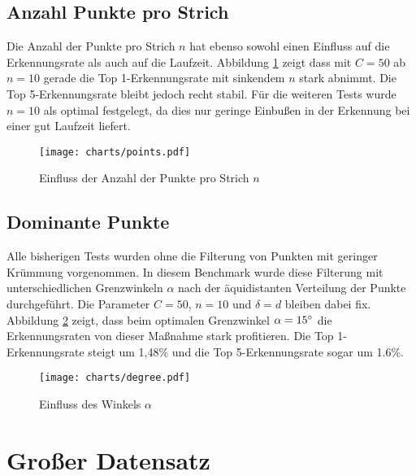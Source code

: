 \subsection{Anzahl Punkte pro Strich} %
\label{sub:anzahl_punkte_pro_strich}

Die Anzahl der Punkte pro Strich $n$ hat ebenso sowohl einen Einfluss auf die Erkennungsrate als auch auf die Laufzeit. Abbildung \ref{chart:points} zeigt dass mit $C=50$ ab $n=10$ gerade die Top 1-Erkennungsrate mit sinkendem $n$ stark abnimmt. Die Top 5-Erkennungsrate bleibt jedoch recht stabil. Für die weiteren Tests wurde $n=10$ als optimal festgelegt, da dies nur geringe Einbußen in der Erkennung bei einer gut Laufzeit liefert.

\begin{figure}[htbp]
  \begin{center}
    \texttt{[image: charts/points.pdf]}
  \end{center}
  \caption{Einfluss der Anzahl der Punkte pro Strich $n$}
  \label{chart:points}
\end{figure}


\subsection{Dominante Punkte} %
\label{sub:dominante_punkte}

Alle bisherigen Tests wurden ohne die Filterung von Punkten mit geringer Krümmung vorgenommen. In diesem Benchmark wurde diese Filterung mit unterschiedlichen Grenzwinkeln $\alpha$ nach der äquidistanten Verteilung der Punkte durchgeführt. Die Parameter $C=50$, $n=10$ und $\delta=d$ bleiben dabei fix. Abbildung \ref{chart:degree} zeigt, dass beim optimalen Grenzwinkel $\alpha=15\degree$ die Erkennungsraten von dieser Maßnahme stark profitieren. Die Top 1-Erkennungsrate steigt um 1,48\% und die Top 5-Erkennungsrate sogar um 1.6\%.

\begin{figure}[htbp]
  \begin{center}
    \texttt{[image: charts/degree.pdf]}
  \end{center}
  \caption{Einfluss des Winkels $\alpha$}
  \label{chart:degree}
\end{figure}


\section{Großer Datensatz}
\label{sec:grosser_datensatz}

